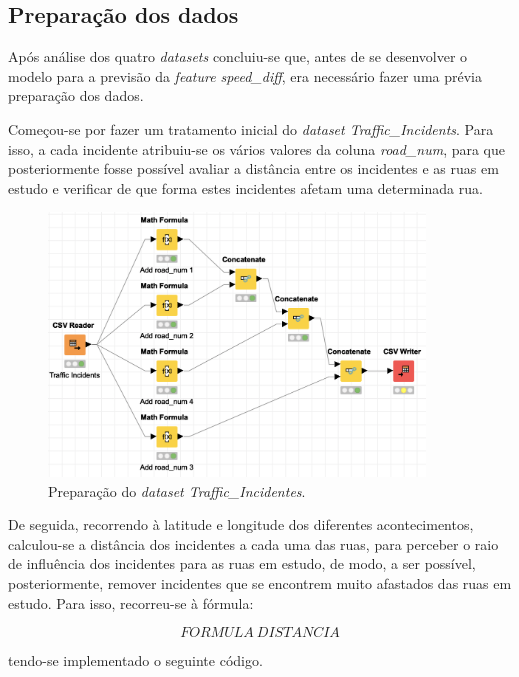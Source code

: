 \documentclass[a4paper, 12pt]{article}
\begin{document}
\subsection{Preparação dos dados}

Após análise dos quatro \textit{datasets} concluiu-se que, antes de se desenvolver o modelo para a previsão da \textit{feature speed\_diff}, era necessário fazer uma prévia preparação dos dados.

Começou-se por fazer um tratamento inicial do \textit{dataset Traffic\_Incidents}. Para isso, a cada incidente atribuiu-se os vários valores da coluna \textit{road\_num}, para que posteriormente fosse possível avaliar a distância entre os incidentes e as ruas em estudo e verificar de que forma estes incidentes afetam uma determinada rua.

\begin{figure}[H]
	\centering
	\includegraphics[width=10cm]{Traffic_Incidents}
	\caption{Preparação do \textit{dataset Traffic\_Incidentes}.}
\end{figure}

De seguida, recorrendo à latitude e longitude dos diferentes acontecimentos, calculou-se a distância dos incidentes a cada uma das ruas, para perceber o raio de influência dos incidentes para as ruas em estudo, de modo, a ser possível, posteriormente, remover incidentes que se encontrem muito afastados das ruas em estudo. Para isso, recorreu-se à fórmula:

$$FORMULA \ DISTANCIA$$

tendo-se implementado o seguinte código.
\end{document}

